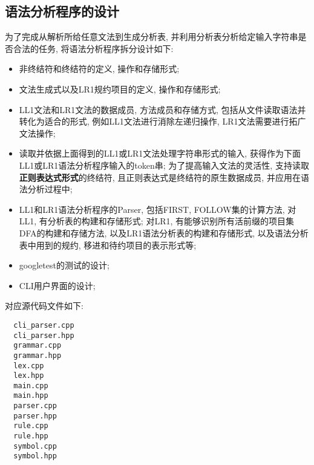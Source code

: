 \subsection{语法分析程序的设计}
为了完成从解析所给任意文法到生成分析表,
并利用分析表分析给定输入字符串是否合法的任务, 将语法分析程序拆分设计如下:
\begin{itemize}
	\item 非终结符和终结符的定义, 操作和存储形式;
	\item 文法生成式以及LR1规约项目的定义, 操作和存储形式;
	\item LL1文法和LR1文法的数据成员, 方法成员和存储方式,
	      包括从文件读取语法并转化为适合的形式, 例如LL1文法进行消除左递归操作,
	      LR1文法需要进行拓广文法操作;
	\item 读取并依据上面得到的LL1或LR1文法处理字符串形式的输入,
	      获得作为下面LL1或LR1语法分析程序输入的token串; 为了提高输入文法的灵活性,
	      支持读取\textbf{正则表达式形式}的终结符, 且正则表达式是终结符的原生数据成员,
	      并应用在语法分析过程中;
	\item LL1和LR1语法分析程序的Parser, 包括FIRST, FOLLOW集的计算方法,
	      对LL1, 有分析表的构建和存储形式; 对LR1,
	      有能够识别所有活前缀的项目集DFA的构建和存储方法,
	      以及LR1语法分析表的构建和存储形式, 以及语法分析表中用到的规约,
	      移进和待约项目的表示形式等;
	\item googletest的测试的设计;
	\item CLI用户界面的设计;
\end{itemize}

对应源代码文件如下:

\begin{lstlisting}
  cli_parser.cpp
  cli_parser.hpp
  grammar.cpp
  grammar.hpp
  lex.cpp
  lex.hpp
  main.cpp
  main.hpp
  parser.cpp
  parser.hpp
  rule.cpp
  rule.hpp
  symbol.cpp
  symbol.hpp
\end{lstlisting}

